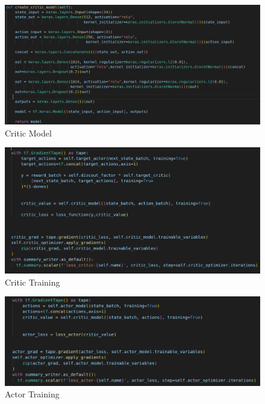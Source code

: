\documentclass[12pt]{extarticle}
\begin{document}
 \begin{figure}[h]  
\centering
\includegraphics[scale=0.30]{critic_model}
\caption[Critic model]{Critic Model}
\end{figure}





    
 \begin{figure}[h]  
\centering
\includegraphics[scale=0.35]{critic_training}
\caption[Critic Training]{Critic Training}
\end{figure}




   
 \begin{figure}[t]  
\centering
\includegraphics[scale=0.35]{actor_training}
\caption[Actor Training]{Actor Training}
\end{figure}
\end{document}
